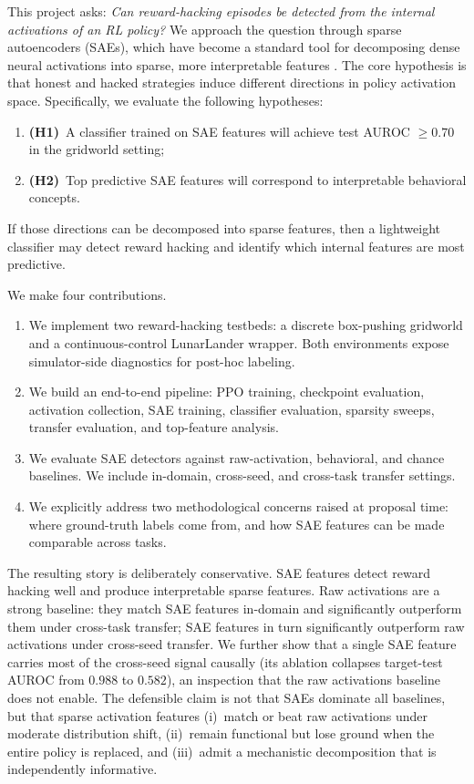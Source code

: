 \documentclass[11pt]{article}
\newcommand{\auroc}{AUROC}
\begin{document}
This project asks: \emph{Can reward-hacking episodes be detected from the internal activations of an RL policy?} We approach the question through sparse autoencoders (SAEs), which have become a standard tool for decomposing dense neural activations into sparse, more interpretable features \cite{bricken2023monosemanticity, templeton2024scaling}. The core hypothesis is that honest and hacked strategies induce different directions in policy activation space. Specifically, we evaluate the following hypotheses:
\begin{enumerate}
    \item \textbf{(H1)}~A classifier trained on SAE features will achieve test \auroc{} $\geq 0.70$ in the gridworld setting;
    \item \textbf{(H2)}~Top predictive SAE features will correspond to interpretable behavioral concepts.
\end{enumerate}
If those directions can be decomposed into sparse features, then a lightweight classifier may detect reward hacking and identify which internal features are most predictive.

We make four contributions.

\begin{enumerate}
  \item We implement two reward-hacking testbeds: a discrete box-pushing gridworld and a continuous-control LunarLander wrapper. Both environments expose simulator-side diagnostics for post-hoc labeling.
  \item We build an end-to-end pipeline: PPO training, checkpoint evaluation, activation collection, SAE training, classifier evaluation, sparsity sweeps, transfer evaluation, and top-feature analysis.
  \item We evaluate SAE detectors against raw-activation, behavioral, and chance baselines. We include in-domain, cross-seed, and cross-task transfer settings.
  \item We explicitly address two methodological concerns raised at proposal time: where ground-truth labels come from, and how SAE features can be made comparable across tasks.
\end{enumerate}

The resulting story is deliberately conservative. SAE features detect reward hacking well and produce interpretable sparse features. Raw activations are a strong baseline: they match SAE features in-domain and significantly outperform them under cross-task transfer; SAE features in turn significantly outperform raw activations under cross-seed transfer. We further show that a single SAE feature carries most of the cross-seed signal causally (its ablation collapses target-test \auroc{} from $0.988$ to $0.582$), an inspection that the raw activations baseline does not enable. The defensible claim is not that SAEs dominate all baselines, but that sparse activation features (i)~match or beat raw activations under moderate distribution shift, (ii)~remain functional but lose ground when the entire policy is replaced, and (iii)~admit a mechanistic decomposition that is independently informative.
\end{document}
